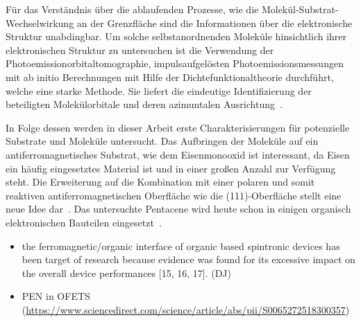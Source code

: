     Für das Verständnis über die ablaufenden Prozesse, wie die Molekül-Substrat-Wechselwirkung an der Grenzfläche sind die Informationen über die elektronische Struktur unabdingbar.
    Um solche selbstanordnenden Moleküle hinsichtlich ihrer elektronischen Struktur zu untersuchen ist die Verwendung der Photoemissionorbitaltomographie, impulsaufgelösten Photoemissionsmessungen mit ab initio Berechnungen mit Hilfe der Dichtefunktionaltheorie durchführt, welche  eine starke Methode.
    Sie liefert die eindeutige Identifizierung der beteiligten Molekülorbitale und deren azimuntalen Ausrichtung~\cite{MM_2, MM_5}.
    
    In Folge dessen werden in dieser Arbeit erste Charakterisierungen für potenzielle Substrate und Moleküle untersucht.
    Das Aufbringen der Moleküle auf ein antiferromagnetisches Substrat, wie dem Eisenmonooxid ist interessant, da Eisen ein häufig eingesetztes Material ist und in einer großen Anzahl zur Verfügung steht. %
    Die Erweiterung auf die Kombination mit einer polaren und somit reaktiven antiferromagnetischen Oberfläche wie die  (111)-Oberfläche stellt eine neue Idee dar~\cite{cappus_hydroxyl_1993}.
    Das untersuchte Pentacene wird heute schon in einigen organisch elektronischen Bauteilen eingesetzt~\cite{5A_4}.


\begin{itemize}
    \item the ferromagnetic/organic interface of organic based spintronic devices has been target of research because evidence was found for its excessive impact on the overall device performances [15, 16, 17]. (DJ)
    \item PEN in OFETS (\url{https://www.sciencedirect.com/science/article/abs/pii/S0065272518300357})
\end{itemize}

